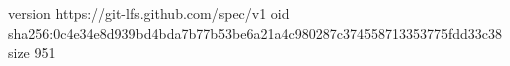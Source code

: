 version https://git-lfs.github.com/spec/v1
oid sha256:0c4e34e8d939bd4bda7b77b53be6a21a4c980287c374558713353775fdd33c38
size 951
